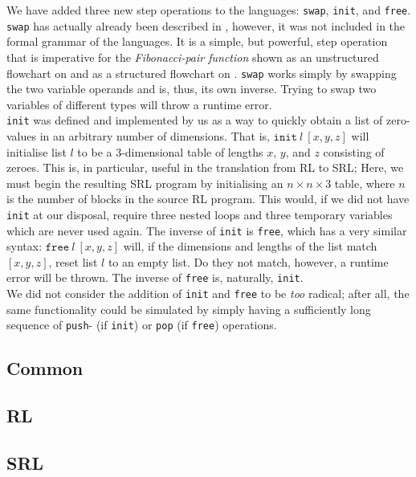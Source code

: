 \noindent We have added three new step operations to the languages: \texttt{swap}, \texttt{init}, and \texttt{free}. \texttt{swap} has actually already been described in \cite[p.~99]{REV}, however, it was not included in the formal grammar of the languages. It is a simple, but powerful, step operation that is imperative for the \textit{Fibonacci-pair function} shown as an unstructured flowchart on \cite[p.~99]{REV} and as a structured flowchart on \cite[p.~93]{REV}. \texttt{swap} works simply by swapping the two variable operands and is, thus, its own inverse. Trying to swap two variables of different types will throw a runtime error. \\
\indent \texttt{init} was defined and implemented by us as a way to quickly obtain a list of zero-values in an arbitrary number of dimensions. That is, $\texttt{init} \ l \ [x,y,z]$ will initialise list $l$ to be a 3-dimensional table of lengths $x$, $y$, and $z$ consisting of zeroes. This is, in particular, useful in the translation from RL to SRL; Here, we must begin the resulting SRL program by initialising an $n \times n \times 3$ table, where $n$ is the number of blocks in the source RL program. This would, if we did not have \texttt{init} at our disposal, require three nested loops and three temporary variables which are never used again. The inverse of \texttt{init} is \texttt{free}, which has a very similar syntax: $\texttt{free} \ l \ [x,y,z]$ will, if the dimensions and lengths of the list match $[x,y,z]$, reset list $l$ to an empty list. Do they not match, however, a runtime error will be thrown. The inverse of \texttt{free} is, naturally, \texttt{init}.\\
\indent We did not consider the addition of \texttt{init} and \texttt{free} to be \textit{too} radical; after all, the same functionality could be simulated by simply having a sufficiently long sequence of \texttt{push}- (if \texttt{init}) or \texttt{pop} (if \texttt{free}) operations.

\subsection*{Common}
%

\subsection*{RL}
%

\subsection*{SRL}
%
